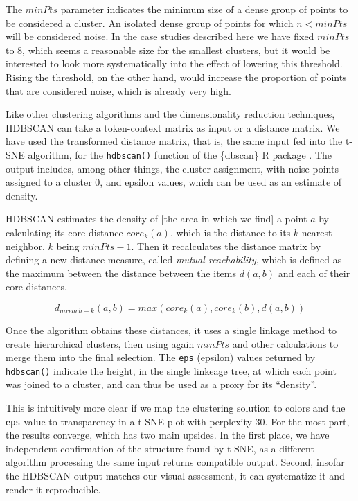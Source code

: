 \documentclass[
]{book}
\begin{document}
The \(minPts\) parameter indicates the minimum size of a dense group of points to be considered
a cluster. An isolated dense group of points for which \(n < minPts\) will be considered noise.
In the case studies described here we have fixed \(minPts\) to 8, which seems a reasonable
size for the smallest clusters, but it would be interested to look more systematically into
the effect of lowering this threshold. Rising the threshold, on the other hand, would
increase the proportion of points that are considered noise, which is already very high.

Like other clustering algorithms and the dimensionality reduction techniques,
HDBSCAN can take a token-context matrix as input or a distance matrix. We have used
the transformed distance matrix, that is, the same input fed into the t-SNE algorithm,
for the \texttt{hdbscan()} function of the \{dbscan\} R package \autocite{R-dbscan}. The output includes,
among other things, the cluster assignment, with noise points assigned to a cluster 0,
and epsilon values, which can be used as an estimate of density.

HDBSCAN estimates the density of {[}the area in which we find{]} a point \(a\) by calculating its
core distance \(core_{k}(a)\), which is the distance to its \(k\) nearest neighbor, \(k\) being \(minPts - 1\).
Then it recalculates the distance matrix by defining a new distance measure, called
\emph{mutual reachability}, which is defined as the maximum between the distance between
the items \(d(a, b)\) and each of their core distances.

\[d_{mreach-k}(a,b) = max(core_{k}(a), core_{k}(b), d(a,b))\]

Once the algorithm obtains these distances, it uses a single linkage method to create
hierarchical clusters, then using again \(minPts\) and other calculations to merge them
into the final selection. The \texttt{eps} (epsilon) values returned by \texttt{hdbscan()} indicate
the height, in the single linkeage tree, at which each point was joined to a cluster,
and can thus be used as a proxy for its ``density''.

This is intuitively more clear if we map the clustering solution to colors and the
\texttt{eps} value to transparency in a t-SNE plot with perplexity 30. For the most part,
the results converge, which has two main upsides. In the first place, we have independent
confirmation of the structure found by t-SNE, as a different algorithm processing
the same input returns compatible output. Second, insofar the HDBSCAN output matches
our visual assessment, it can systematize it and render it reproducible.
\end{document}
